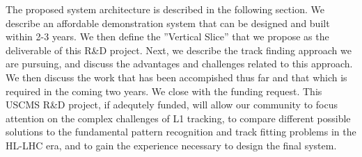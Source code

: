 
The proposed system architecture is described in the following section. We describe an affordable demonstration system that can be designed and built within 2-3 years.  We then define the ”Vertical Slice” that we propose as the deliverable of this R\&D project. Next, we describe the track finding approach we are pursuing, and discuss the advantages and challenges related to this approach.  We then discuss the work that has been accompished thus far and that which is required in the coming two years.  We close with the funding request. This USCMS R\&D project, if adequtely funded, will allow our community to focus attention on the complex challenges of L1 tracking, to compare different possible solutions to the fundamental pattern recognition and track fitting problems in the HL-LHC era, and to gain the experience necessary to design the final system.






